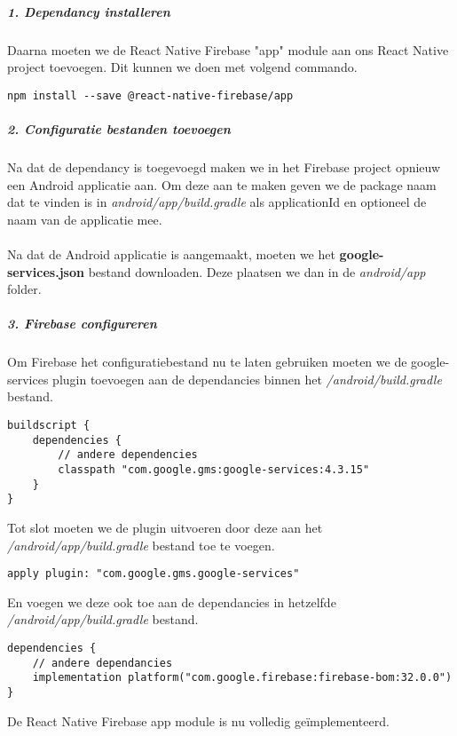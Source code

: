 \subparagraph{1. Dependancy installeren}
Daarna moeten we de React Native Firebase "app" module aan ons React Native project toevoegen. 
Dit kunnen we doen met volgend commando.
\begin{verbatim}
npm install --save @react-native-firebase/app
\end{verbatim}

\subparagraph{2. Configuratie bestanden toevoegen}
Na dat de dependancy is toegevoegd maken we in het Firebase project opnieuw een Android applicatie aan. 
Om deze aan te maken geven we de package naam dat te vinden is in \textit{android/app/build.gradle} als 
applicationId en optioneel de naam van de applicatie mee.
\\\\
Na dat de Android applicatie is aangemaakt, moeten we het \textbf{google-services.json} bestand downloaden. 
Deze plaatsen we dan in de \textit{android/app} folder.

\subparagraph{3. Firebase configureren}
Om Firebase het configuratiebestand nu te laten gebruiken moeten we de google-services plugin toevoegen aan 
de dependancies binnen het \textit{/android/build.gradle} bestand. 
\begin{verbatim}
buildscript {
    dependencies {
        // andere dependencies
        classpath "com.google.gms:google-services:4.3.15"
    }
}
\end{verbatim}
Tot slot moeten we de plugin uitvoeren door deze aan het \textit{/android/app/build.gradle} bestand toe te voegen.
\begin{verbatim}
apply plugin: "com.google.gms.google-services"
\end{verbatim}
En voegen we deze ook toe aan de dependancies in hetzelfde \textit{/android/app/build.gradle} bestand.
\begin{verbatim}
dependencies {
    // andere dependancies
    implementation platform("com.google.firebase:firebase-bom:32.0.0")
}
\end{verbatim}
De React Native Firebase app module is nu volledig geïmplementeerd.